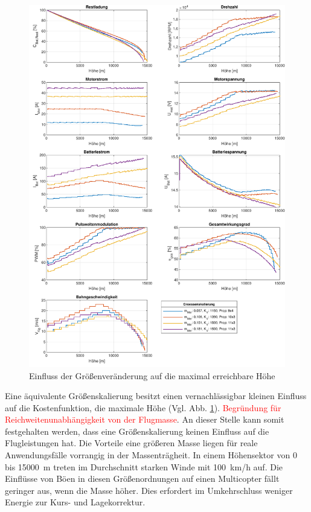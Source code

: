 \begin{figure}[H]
	\includegraphics[scale=0.7]{Diagramme/Groessenskalierung.pdf}
	\caption{Einfluss der Größenveränderung auf die maximal erreichbare Höhe}
	\label{abb:groessenskalierung}
\end{figure}
Eine äquivalente Größenskalierung besitzt einen vernachlässigbar kleinen Einfluss auf die Kostenfunktion, die maximale Höhe (Vgl. Abb. \ref{abb:groessenskalierung}). 
\textcolor{red}{Begründung für Reichweitenunabhängigkeit von der Flugmasse}. An dieser Stelle kann somit festgehalten werden, dass eine Größenskalierung keinen Einfluss auf die Flugleistungen hat. Die Vorteile eine größeren Masse liegen für reale Anwendungsfälle vorrangig in der Massenträgheit. In einem Höhensektor von \SI{0}{} bis \SI{15000}{m} treten im Durchschnitt starken Winde mit \SI{100}{km/h} auf. Die Einflüsse von Böen in diesen Größenordnungen auf einen Multicopter fällt geringer aus, wenn die Masse höher. Dies erfordert im Umkehrschluss weniger Energie zur Kurs- und Lagekorrektur.

